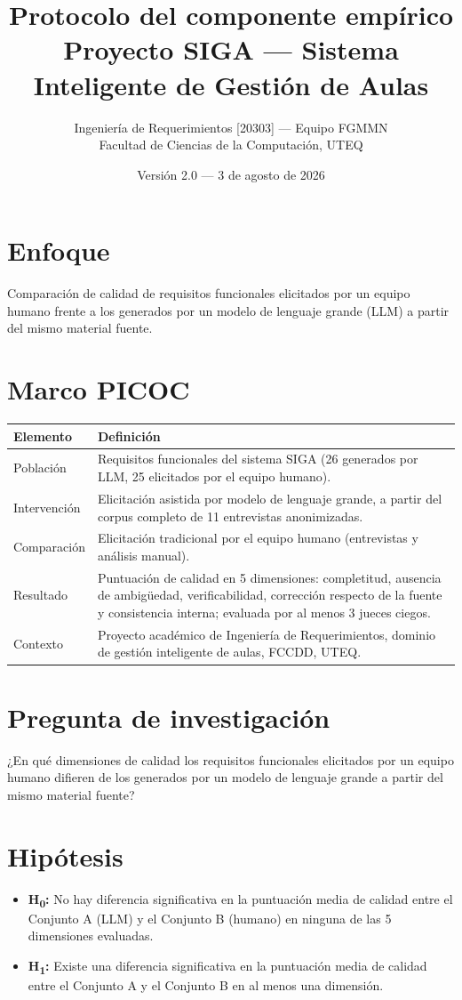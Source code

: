 \documentclass[11pt,a4paper]{article}
\title{\textbf{Protocolo del componente empírico}\\[0.3em]
\large Proyecto SIGA --- Sistema Inteligente de Gestión de Aulas}
\author{Ingeniería de Requerimientos [20303] --- Equipo FGMMN\\
Facultad de Ciencias de la Computación, UTEQ}
\date{Versión 2.0 --- 3 de agosto de 2026}
\begin{document}
\maketitle

\section*{Enfoque}
Comparación de calidad de requisitos funcionales elicitados por un equipo humano
frente a los generados por un modelo de lenguaje grande (LLM) a partir del mismo
material fuente.

\section{Marco PICOC}
\begin{longtable}{p{3.2cm}p{11cm}}
\toprule
\textbf{Elemento} & \textbf{Definición} \\
\midrule
\endhead
Población & Requisitos funcionales del sistema SIGA (26 generados por LLM, 25 elicitados por el equipo humano). \\
Intervención & Elicitación asistida por modelo de lenguaje grande, a partir del corpus completo de 11 entrevistas anonimizadas. \\
Comparación & Elicitación tradicional por el equipo humano (entrevistas y análisis manual). \\
Resultado & Puntuación de calidad en 5 dimensiones: completitud, ausencia de ambigüedad, verificabilidad, corrección respecto de la fuente y consistencia interna; evaluada por al menos 3 jueces ciegos. \\
Contexto & Proyecto académico de Ingeniería de Requerimientos, dominio de gestión inteligente de aulas, FCCDD, UTEQ. \\
\bottomrule
\end{longtable}

\section{Pregunta de investigación}
¿En qué dimensiones de calidad los requisitos funcionales elicitados por un equipo
humano difieren de los generados por un modelo de lenguaje grande a partir del mismo
material fuente?

\section{Hipótesis}
\begin{itemize}[leftmargin=*]
  \item \textbf{H\textsubscript{0}:} No hay diferencia significativa en la puntuación
        media de calidad entre el Conjunto A (LLM) y el Conjunto B (humano) en
        ninguna de las 5 dimensiones evaluadas.
  \item \textbf{H\textsubscript{1}:} Existe una diferencia significativa en la
        puntuación media de calidad entre el Conjunto A y el Conjunto B en al menos
        una dimensión.
\end{itemize}
\end{document}
